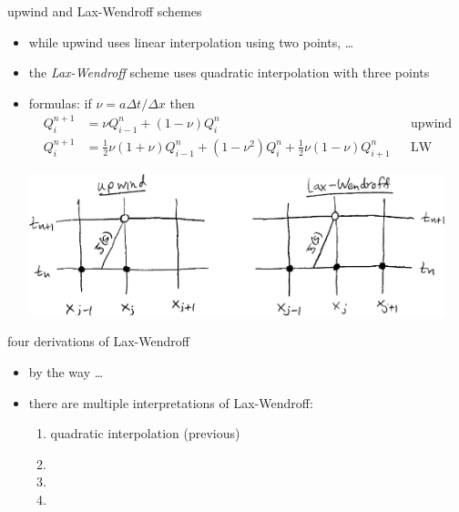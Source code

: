 \documentclass[10pt,dvipsnames,usepdftitle=false,
hyperref={pdftitle = {Finite volume methods},
    pdfauthor = {Ed Bueler}}]{beamer}
\begin{document}
\begin{frame}{upwind and Lax-Wendroff schemes}

\begin{itemize}
\item while upwind uses linear interpolation using two points, \dots
\item the \emph{Lax-Wendroff} scheme uses quadratic interpolation with three points
\item formulas: if $\nu = a\Delta t/\Delta x$ then
\begin{align*}
Q_i^{n+1} &= \nu Q_{i-1}^n + \left(1 - \nu\right) Q_i^n &&\text{upwind} \\
Q_i^{n+1} &= \tfrac{1}{2} \nu (1+\nu) Q_{i-1}^n + \left(1 - \nu^2\right) Q_i^n + \tfrac{1}{2} \nu (1-\nu) Q_{i+1}^n &&\text{LW}
\end{align*}

\begin{center}
\includegraphics[width=0.95\textwidth]{figs/stencilssketch}
\end{center}
\end{itemize}
\end{frame}


\begin{frame}{four derivations of Lax-Wendroff}

\begin{itemize}
\item by the way \dots
\item there are multiple interpretations of Lax-Wendroff:
    \begin{enumerate}
    \item<1-4> quadratic interpolation (previous)
    \item<2-4> 
    \item<3-4> 
    \item<4> 
    \end{enumerate}
\end{itemize}
\end{frame}
\end{document}
